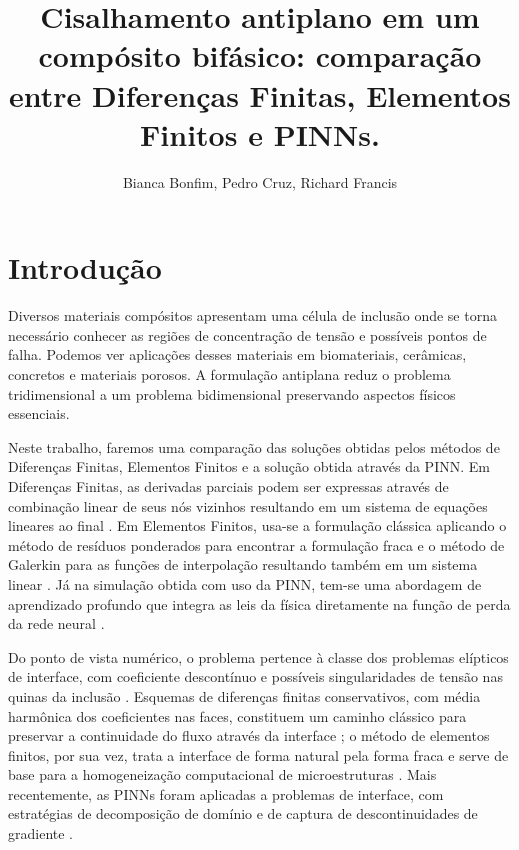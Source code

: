 \documentclass[brazil]{TCAM} %
\title{Cisalhamento antiplano em um compósito bifásico: comparação entre Diferenças
Finitas, Elementos Finitos e PINNs.}
\author{Bianca Bonfim, Pedro Cruz, Richard Francis
}
\begin{document}

\maketitle


\section{Introdução}

Diversos materiais compósitos apresentam uma célula de inclusão onde se torna necessário conhecer as regiões de concentração de tensão e possíveis pontos de falha. Podemos ver aplicações desses materiais em biomateriais, cerâmicas, concretos e materiais porosos.
A formulação antiplana reduz o problema tridimensional a um problema bidimensional preservando aspectos físicos essenciais.

Neste trabalho, faremos uma comparação das soluções obtidas pelos métodos de Diferenças Finitas, Elementos Finitos e a solução obtida através da PINN. Em Diferenças Finitas, as derivadas parciais podem ser expressas através de combinação linear de seus nós vizinhos resultando em um sistema de equações lineares ao final \cite{lin2021simulation}\cite{leveque2007}. Em Elementos Finitos, usa-se a formulação clássica aplicando o método de resíduos ponderados para encontrar a formulação fraca e o método de Galerkin para as funções de interpolação resultando também em um sistema linear \cite{logan}. Já na simulação obtida com uso da PINN, tem-se uma abordagem de aprendizado profundo que integra as leis da física diretamente na função de perda da rede neural \cite{goodfellow2016deep,raissi2019pinn,karniadakis2021physics,lu2021deepxde}.

Do ponto de vista numérico, o problema pertence à classe dos problemas elípticos de interface, com coeficiente descontínuo e possíveis singularidades de tensão nas quinas da inclusão \cite{kohno1995singularities}. Esquemas de diferenças finitas conservativos, com média harmônica dos coeficientes nas faces, constituem um caminho clássico para preservar a continuidade do fluxo através da interface \cite{leveque2007,quarteroni2007numerical,beale2006accuracy}; o método de elementos finitos, por sua vez, trata a interface de forma natural pela forma fraca e serve de base para a homogeneização computacional de microestruturas \cite{babuska1970finite,hughes2000finite,geers2010multiscale,torquato2002random,moulinec1998numerical}. Mais recentemente, as PINNs foram aplicadas a problemas de interface, com estratégias de decomposição de domínio e de captura de descontinuidades de gradiente \cite{jagtap2020conservative,jagtap2020extended,moseley2023finite,wu2023convergence,tseng2023cusp}.
\end{document}
